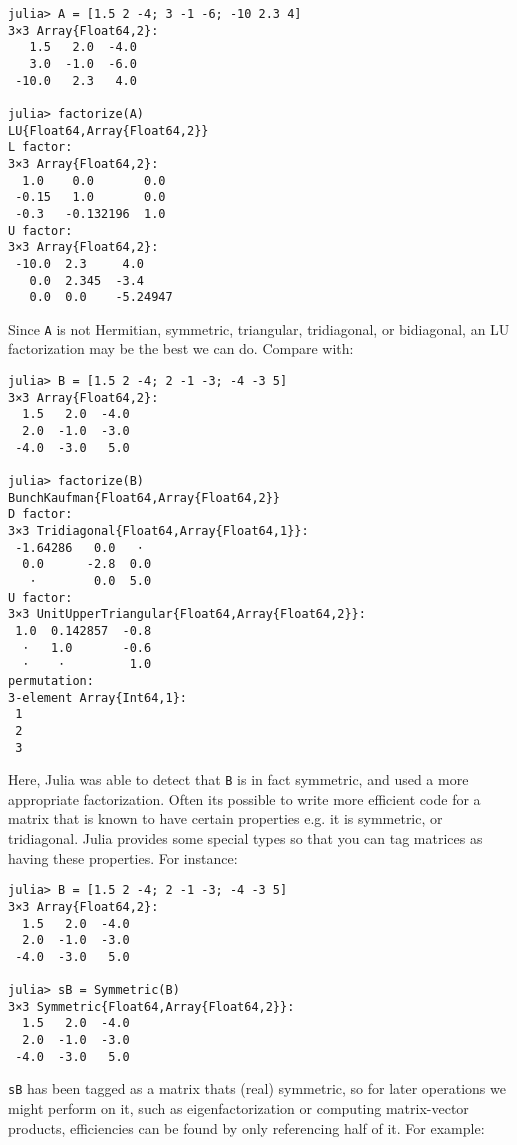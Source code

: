 \begin{verbatim}
julia> A = [1.5 2 -4; 3 -1 -6; -10 2.3 4]
3×3 Array{Float64,2}:
   1.5   2.0  -4.0
   3.0  -1.0  -6.0
 -10.0   2.3   4.0

julia> factorize(A)
LU{Float64,Array{Float64,2}}
L factor:
3×3 Array{Float64,2}:
  1.0    0.0       0.0
 -0.15   1.0       0.0
 -0.3   -0.132196  1.0
U factor:
3×3 Array{Float64,2}:
 -10.0  2.3     4.0
   0.0  2.345  -3.4
   0.0  0.0    -5.24947
\end{verbatim}



Since \texttt{A} is not Hermitian, symmetric, triangular, tridiagonal, or bidiagonal, an LU factorization may be the best we can do. Compare with:




\begin{verbatim}
julia> B = [1.5 2 -4; 2 -1 -3; -4 -3 5]
3×3 Array{Float64,2}:
  1.5   2.0  -4.0
  2.0  -1.0  -3.0
 -4.0  -3.0   5.0

julia> factorize(B)
BunchKaufman{Float64,Array{Float64,2}}
D factor:
3×3 Tridiagonal{Float64,Array{Float64,1}}:
 -1.64286   0.0   ⋅
  0.0      -2.8  0.0
   ⋅        0.0  5.0
U factor:
3×3 UnitUpperTriangular{Float64,Array{Float64,2}}:
 1.0  0.142857  -0.8
  ⋅   1.0       -0.6
  ⋅    ⋅         1.0
permutation:
3-element Array{Int64,1}:
 1
 2
 3
\end{verbatim}



Here, Julia was able to detect that \texttt{B} is in fact symmetric, and used a more appropriate factorization. Often it{\textquotesingle}s possible to write more efficient code for a matrix that is known to have certain properties e.g. it is symmetric, or tridiagonal. Julia provides some special types so that you can {\textquotedbl}tag{\textquotedbl} matrices as having these properties. For instance:




\begin{verbatim}
julia> B = [1.5 2 -4; 2 -1 -3; -4 -3 5]
3×3 Array{Float64,2}:
  1.5   2.0  -4.0
  2.0  -1.0  -3.0
 -4.0  -3.0   5.0

julia> sB = Symmetric(B)
3×3 Symmetric{Float64,Array{Float64,2}}:
  1.5   2.0  -4.0
  2.0  -1.0  -3.0
 -4.0  -3.0   5.0
\end{verbatim}



\texttt{sB} has been tagged as a matrix that{\textquotesingle}s (real) symmetric, so for later operations we might perform on it, such as eigenfactorization or computing matrix-vector products, efficiencies can be found by only referencing half of it. For example:




